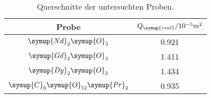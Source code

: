 \begin{table}[!htp]
\centering
\caption{Querschnitte der untersuchten Proben.}
\label{tab:querschnitt}
\begin{tabular}{c c}
\toprule
{Probe} & {$Q_{\symup{real}} / 10^{-5} m^2$}  \\
\midrule
$\symup{Nd}_2\symup{O}_3$               &  0.921 \\  
$\symup{Gd}_2\symup{O}_3$               & 1.411 \\
$\symup{Dy}_2\symup{O}_3$               & 1.434 \\
$\symup{C}_6\symup{O}_{12}\symup{Pr}_2$ & 0.935 \\
\bottomrule
\end{tabular}
\end{table}